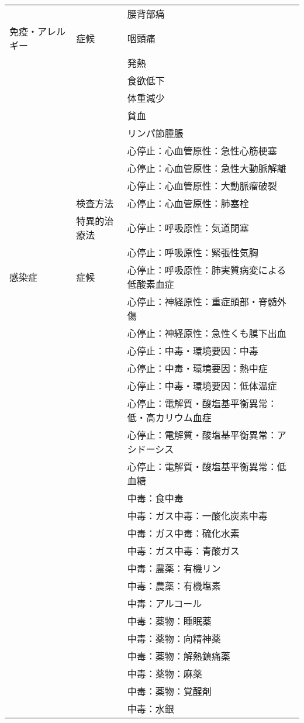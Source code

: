 \begin{xltabular}{\linewidth}{XXX}
 &  & 腰背部痛 \\
免疫・アレルギー & 症候 & 咽頭痛 \\
 &  & 発熱 \\
 &  & 食欲低下 \\
 &  & 体重減少 \\
 &  & 貧血 \\
 &  & リンパ節腫脹 \\
 &  & 心停止：心血管原性：急性心筋梗塞 \\
 &  & 心停止：心血管原性：急性大動脈解離 \\
 &  & 心停止：心血管原性：大動脈瘤破裂 \\
 & 検査方法 & 心停止：心血管原性：肺塞栓 \\
 & 特異的治療法 & 心停止：呼吸原性：気道閉塞 \\
 &  & 心停止：呼吸原性：緊張性気胸 \\
感染症 & 症候 & 心停止：呼吸原性：肺実質病変による低酸素血症 \\
 &  & 心停止：神経原性：重症頭部・脊髄外傷 \\
 &  & 心停止：神経原性：急性くも膜下出血 \\
 &  & 心停止：中毒・環境要因：中毒 \\
 &  & 心停止：中毒・環境要因：熱中症 \\
 &  & 心停止：中毒・環境要因：低体温症 \\
 &  & 心停止：電解質・酸塩基平衡異常：低・高カリウム血症 \\
 &  & 心停止：電解質・酸塩基平衡異常：アシドーシス \\
 &  & 心停止：電解質・酸塩基平衡異常：低血糖 \\
 &  & 中毒：食中毒 \\
 &  & 中毒：ガス中毒：一酸化炭素中毒 \\
 &  & 中毒：ガス中毒：硫化水素 \\
 &  & 中毒：ガス中毒：青酸ガス \\
 &  & 中毒：農薬：有機リン \\
 &  & 中毒：農薬：有機塩素 \\
 &  & 中毒：アルコール \\
 &  & 中毒：薬物：睡眠薬 \\
 &  & 中毒：薬物：向精神薬 \\
 &  & 中毒：薬物：解熱鎮痛薬 \\
 &  & 中毒：薬物：麻薬 \\
 &  & 中毒：薬物：覚醒剤 \\
 &  & 中毒：水銀 \\

\end{xltabular}
